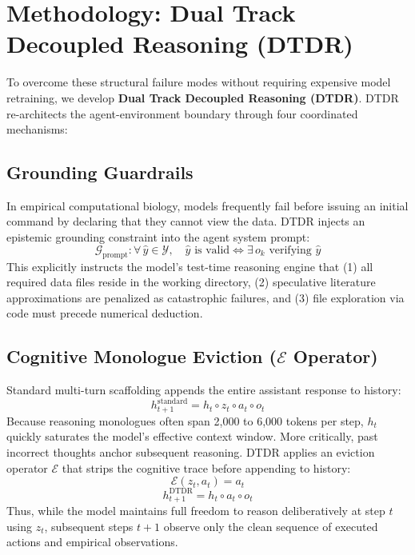 \documentclass[11pt,letterpaper]{article}
\begin{document}
\section{Methodology: Dual Track Decoupled Reasoning (DTDR)}

To overcome these structural failure modes without requiring expensive model retraining, we develop \textbf{Dual Track Decoupled Reasoning (DTDR)}. DTDR re-architects the agent-environment boundary through four coordinated mechanisms:

\subsection{Grounding Guardrails}
In empirical computational biology, models frequently fail before issuing an initial command by declaring that they cannot view the data. DTDR injects an epistemic grounding constraint into the agent system prompt:
\begin{equation}
\mathcal{G}_{\text{prompt}}: \forall \, \hat{y} \in \mathcal{Y}, \quad \hat{y} \text{ is valid} \iff \exists \, o_k \text{ verifying } \hat{y}
\end{equation}
This explicitly instructs the model's test-time reasoning engine that (1) all required data files reside in the working directory, (2) speculative literature approximations are penalized as catastrophic failures, and (3) file exploration via code must precede numerical deduction.

\subsection{Cognitive Monologue Eviction ($\mathcal{E}$ Operator)}
Standard multi-turn scaffolding appends the entire assistant response to history:
\begin{equation}
h_{t+1}^{\text{standard}} = h_t \circ z_t \circ a_t \circ o_t
\end{equation}
Because reasoning monologues often span 2,000 to 6,000 tokens per step, $h_t$ quickly saturates the model's effective context window. More critically, past incorrect thoughts anchor subsequent reasoning. DTDR applies an eviction operator $\mathcal{E}$ that strips the cognitive trace before appending to history:
\begin{equation}
\mathcal{E}(z_t, a_t) = a_t
\end{equation}
\begin{equation}
h_{t+1}^{\text{DTDR}} = h_t \circ a_t \circ o_t
\end{equation}
Thus, while the model maintains full freedom to reason deliberatively at step $t$ using $z_t$, subsequent steps $t+1$ observe only the clean sequence of executed actions and empirical observations.
\end{document}
